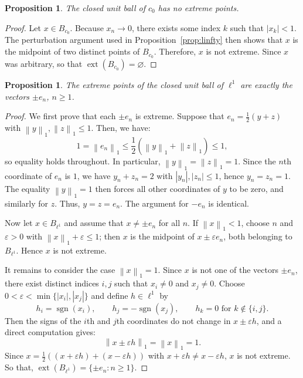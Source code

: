 \documentclass[reqno]{amsart}
\newtheorem{proposition}[theorem]{Proposition}
\theoremstyle{definition}
\newcommand{\norm}[1]{\left\lVert #1 \right\rVert}
\newcommand{\abs}[1]{\left\lvert #1 \right\rvert}
\newcommand{\ext}{\operatorname{ext}}
\begin{document}
\begin{proposition}\label{prop:c0}
The closed unit ball of $c_0$ has no extreme points.
\end{proposition}

\begin{proof}
Let $x \in B_{c_0}$. Because $x_n \to 0$, there exists some index $k$ such that $\abs{x_k} < 1$. The perturbation argument used in Proposition~\ref{prop:linfty} then shows that $x$ is the midpoint of two distinct points of $B_{c_0}$. Therefore, $x$ is not extreme. Since $x$ was arbitrary, so that $\ext(B_{c_0}) = \varnothing$.
\end{proof}

\begin{proposition}\label{prop:l1}
The extreme points of the closed unit ball of $\ell^1$ are exactly the vectors $\pm e_n$,
$n \ge 1$.
\end{proposition}

\begin{proof}
We first prove that each $\pm e_n$ is extreme. Suppose that $e_n = \frac12(y+z)$ with $\norm{y}_1, \norm{z}_1 \le 1$. Then, we have:
\begin{equation*}
    1 = \norm{e_n}_1 \le \frac12\left(\norm{y}_1 + \norm{z}_1\right) \le 1,
\end{equation*}
so equality holds throughout. In particular, $\norm{y}_1 = \norm{z}_1 = 1$. Since the $n$th
coordinate of $e_n$ is $1$, we have $y_n + z_n = 2$ with $\abs{y_n}, \abs{z_n} \le 1$, hence
$y_n = z_n = 1$. The equality $\norm{y}_1 = 1$ then forces all other coordinates of $y$ to be
zero, and similarly for $z$. Thus, $y = z = e_n$. The argument for $-e_n$ is identical.

Now let $x \in B_{\ell^1}$ and assume that $x \neq \pm e_n$ for all $n$. If $\norm{x}_1 < 1$, choose $n$ and $\varepsilon > 0$ with $\norm{x}_1 + \varepsilon \le 1$; then $x$ is the midpoint of $x \pm \varepsilon e_n$, both belonging to $B_{\ell^1}$. Hence $x$ is not extreme.

It remains to consider the case $\norm{x}_1 = 1$. Since $x$ is not one of the vectors $\pm e_n$, there exist distinct indices $i,j$ such that $x_i \neq 0$ and $x_j \neq 0$. Choose
$0 < \varepsilon < \min\{\abs{x_i}, \abs{x_j}\}$ and define $h \in \ell^1$ by
\begin{equation*}
    h_i = \operatorname{sgn}(x_i), \qquad h_j = -\operatorname{sgn}(x_j), \qquad h_k = 0 \text{ for } k \notin \{i,j\}.
\end{equation*}
Then the signs of the $i$th and $j$th coordinates do not change in $x \pm \varepsilon h$, and a direct computation gives:
\begin{equation*}
    \norm{x \pm \varepsilon h}_1 = \norm{x}_1 = 1.
\end{equation*}
Since $x = \frac12((x+\varepsilon h) + (x-\varepsilon h))$ with $x+\varepsilon h \neq x-\varepsilon h$, $x$ is not extreme. So that, $\ext(B_{\ell^1}) = \{\pm e_n : n \ge 1\}$.
\end{proof}
\end{document}
